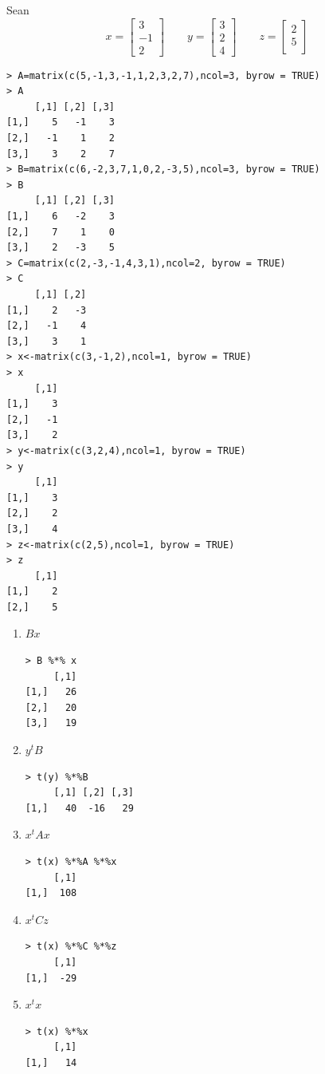\documentclass[12pt,a4paper]{report}
\begin{document}
\begin{enumerate}
Sean 
\begin{equation*}
x=\begin{bmatrix}
3\\
-1\\
2
\end{bmatrix} \qquad
y=\begin{bmatrix}
3\\
2\\
4
\end{bmatrix} \qquad
z=\begin{bmatrix}
2\\
5\\
\end{bmatrix}
\end{equation*}
\begin{verbatim}
> A=matrix(c(5,-1,3,-1,1,2,3,2,7),ncol=3, byrow = TRUE)
> A
     [,1] [,2] [,3]
[1,]    5   -1    3
[2,]   -1    1    2
[3,]    3    2    7
> B=matrix(c(6,-2,3,7,1,0,2,-3,5),ncol=3, byrow = TRUE)
> B
     [,1] [,2] [,3]
[1,]    6   -2    3
[2,]    7    1    0
[3,]    2   -3    5
> C=matrix(c(2,-3,-1,4,3,1),ncol=2, byrow = TRUE)
> C
     [,1] [,2]
[1,]    2   -3
[2,]   -1    4
[3,]    3    1
> x<-matrix(c(3,-1,2),ncol=1, byrow = TRUE)
> x
     [,1]
[1,]    3
[2,]   -1
[3,]    2
> y<-matrix(c(3,2,4),ncol=1, byrow = TRUE)
> y
     [,1]
[1,]    3
[2,]    2
[3,]    4
> z<-matrix(c(2,5),ncol=1, byrow = TRUE)
> z
     [,1]
[1,]    2
[2,]    5
\end{verbatim}
\begin{enumerate}
\item $Bx$
\begin{verbatim}
> B %*% x
     [,1]
[1,]   26
[2,]   20
[3,]   19
\end{verbatim}
\item $y^{t}B$
\begin{verbatim}
> t(y) %*%B 
     [,1] [,2] [,3]
[1,]   40  -16   29
\end{verbatim}
\item $x^{t}Ax$
\begin{verbatim}
> t(x) %*%A %*%x  
     [,1]
[1,]  108
\end{verbatim}
\item $x^{t}Cz$
\begin{verbatim}
> t(x) %*%C %*%z  
     [,1]
[1,]  -29
\end{verbatim}
\item $x^{t}x$
\begin{verbatim}
> t(x) %*%x 
     [,1]
[1,]   14
\end{verbatim}

\end{enumerate}
\end{enumerate}
\end{document}
